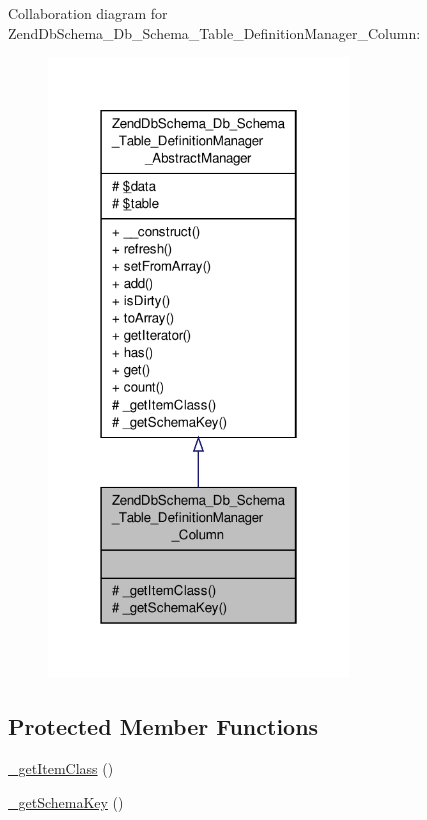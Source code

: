 Collaboration diagram for Zend\-Db\-Schema\-\_\-\-Db\-\_\-\-Schema\-\_\-\-Table\-\_\-\-Definition\-Manager\-\_\-\-Column\-:\nopagebreak
\begin{figure}[H]
\begin{center}
\leavevmode
\includegraphics[width=226pt]{classZendDbSchema__Db__Schema__Table__DefinitionManager__Column__coll__graph}
\end{center}
\end{figure}
\subsection*{Protected Member Functions}
\begin{DoxyCompactItemize}
\item 
\hyperlink{classZendDbSchema__Db__Schema__Table__DefinitionManager__Column_ad9232d159ffbd661c44ade16797fb2e7}{\-\_\-get\-Item\-Class} ()
\item 
\hyperlink{classZendDbSchema__Db__Schema__Table__DefinitionManager__Column_af69c9106af33765a74af4d148023682b}{\-\_\-get\-Schema\-Key} ()
\end{DoxyCompactItemize}
